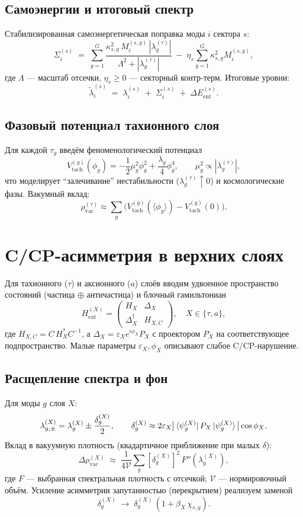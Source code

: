 \documentclass[12pt,a4paper]{article}
\begin{document}
\subsection*{Самоэнергии и итоговый спектр}
Стабилизированная самоэнергетическая поправка моды $i$ сектора $s$:
\begin{equation}
\Sigma^{(s)}_{i}\;=\;\sum_{g=1}^{G}
\frac{\kappa_{s,g}^2\, M^{(s,g)}_{i}\,|\lambda^{(\tau)}_g|}{\Lambda^2+|\lambda^{(\tau)}_g|}
\;-\;\eta_s \sum_{g=1}^G \kappa_{s,g}^2 M^{(s,g)}_{i},
\label{eq:selfenergy}
\end{equation}
где $\Lambda$ --- масштаб отсечки, $\eta_s\ge 0$ --- секторный контр-терм.
Итоговые уровни:
\[
\tilde{\lambda}^{(s)}_i \;=\; \lambda^{(s)}_i \;+\; \Sigma^{(s)}_{i} \;+\; \Delta E^{(s)}_{\text{ent}} .
\]

\subsection*{Фазовый потенциал тахионного слоя}
Для каждой $\tau_g$ введём феноменологический потенциал
\[
V_{\text{tach}}^{(g)}(\phi_g)= -\frac{1}{2}\mu_g^2\phi_g^2 + \frac{\lambda_g}{4}\phi_g^4,\qquad \mu_g^2\propto |\lambda^{(\tau)}_g|,
\]
что моделирует ``залечивание'' нестабильности ($\lambda^{(\tau)}_g\uparrow 0$) и космологические фазы.
Вакумный вклад:
\[
\rho_{\text{vac}}^{(\tau)} \approx \sum_g \Big(V_{\text{tach}}^{(g)}(\langle\phi_g\rangle)-V_{\text{tach}}^{(g)}(0)\Big).
\]

\section{C/CP-асимметрия в верхних слоях}
Для тахионного ($\tau$) и аксионного ($a$) слоёв вводим удвоенное пространство состояний (частица $\oplus$ античастица) и блочный гамильтониан
\[
H_{\text{ext}}^{(X)}=
\begin{pmatrix}
H_X & \Delta_X \\
\Delta_X^\dagger & H_{X,C}
\end{pmatrix},\quad X\in\{\tau,a\},
\]
где $H_{X,C}=C\,H_X^* C^{-1}$, а $\Delta_X=\varepsilon_X e^{i\phi_X} P_X$ с проектором $P_X$ на соответствующее подпространство. Малые параметры $\varepsilon_X,\phi_X$ описывают слабое C/CP-нарушение.

\subsection*{Расщепление спектра и фон}
Для моды $g$ слоя $X$:
\[
\lambda^{(X)}_{g,\pm}=\lambda^{(X)}_{g}\pm \frac{\delta^{(X)}_g}{2},\qquad
\delta^{(X)}_g \approx 2\varepsilon_X \big|\bra{\psi^{(X)}_g}P_X\ket{\psi^{(X)}_g}\big|\cos\phi_X .
\]
Вклад в вакуумную плотность (квадартичное приближение при малых $\delta$):
\[
\Delta\rho_{\text{vac}}^{(X)} \;\approx\; \frac{1}{4\mathcal{V}} \sum_g [\delta^{(X)}_g]^2\, F''(\lambda^{(X)}_g),
\]
где $F$ --- выбранная спектральная плотность с отсечкой; $\mathcal{V}$ --- нормировочный объём.
Усиление асимметрии запутанностью (перекрытием) реализуем заменой
\[
\delta^{(X)}_{g}\;\to\; \delta^{(X)}_{g}\,(1+\beta_X\,\chi_{s,g}).
\]
\end{document}
